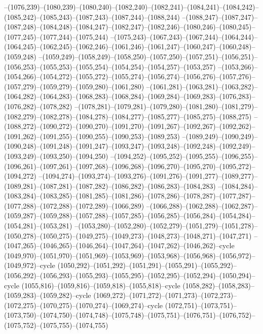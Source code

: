 --(1076,239)--(1080,239)--(1080,240)--(1082,240)--(1082,241)--(1084,241)--(1084,242)--(1085,242)--(1085,243)--(1087,243)--(1087,244)--(1088,244)
--(1088,247)--(1087,247)--(1087,248)--(1084,248)--(1084,247)--(1082,247)--(1082,246)--(1080,246)--(1080,245)--(1077,245)--(1077,244)--(1075,244)
--(1075,243)--(1067,243)--(1067,244)--(1064,244)--(1064,245)--(1062,245)--(1062,246)--(1061,246)--(1061,247)--(1060,247)--(1060,248)--(1059,248)
--(1059,249)--(1058,249)--(1058,250)--(1057,250)--(1057,251)--(1056,251)--(1056,253)--(1055,253)--(1055,254)--(1054,254)--(1054,257)--(1053,257)
--(1053,266)--(1054,266)--(1054,272)--(1055,272)--(1055,274)--(1056,274)--(1056,276)--(1057,276)--(1057,279)--(1059,279)--(1059,280)--(1061,280)
--(1061,281)--(1063,281)--(1063,282)--(1064,282)--(1064,283)--(1068,283)--(1068,284)--(1069,284)--(1069,283)--(1076,283)--(1076,282)--(1078,282)
--(1078,281)--(1079,281)--(1079,280)--(1081,280)--(1081,279)--(1082,279)--(1082,278)--(1084,278)--(1084,277)--(1085,277)--(1085,275)--(1088,275)
--(1088,272)--(1090,272)--(1090,270)--(1091,270)--(1091,267)--(1092,267)--(1092,262)--(1091,262)--(1091,255)--(1090,255)--(1090,253)--(1089,253)
--(1089,249)--(1090,249)--(1090,248)--(1091,248)--(1091,247)--(1093,247)--(1093,248)--(1092,248)--(1092,249)--(1093,249)--(1093,250)--(1094,250)
--(1094,252)--(1095,252)--(1095,255)--(1096,255)--(1096,261)--(1097,261)--(1097,268)--(1096,268)--(1096,270)--(1095,270)--(1095,272)--(1094,272)
--(1094,274)--(1093,274)--(1093,276)--(1091,276)--(1091,277)--(1089,277)--(1089,281)--(1087,281)--(1087,282)--(1086,282)--(1086,283)--(1084,283)
--(1084,284)--(1083,284)--(1083,285)--(1081,285)--(1081,286)--(1078,286)--(1078,287)--(1077,287)--(1077,288)--(1072,288)--(1072,289)--(1066,289)
--(1066,288)--(1062,288)--(1062,287)--(1059,287)--(1059,288)--(1057,288)--(1057,285)--(1056,285)--(1056,284)--(1054,284)--(1054,281)--(1053,281)
--(1053,280)--(1052,280)--(1052,279)--(1051,279)--(1051,278)--(1050,278)--(1050,275)--(1049,275)--(1049,273)--(1048,273)--(1048,271)--(1047,271)
--(1047,265)--(1046,265)--(1046,264)--(1047,264)--(1047,262)--(1046,262)--cycle
(1049,970)--(1051,970)--(1051,969)--(1053,969)--(1053,968)--(1056,968)--(1056,972)--(1049,972)--cycle
(1050,292)--(1051,292)--(1051,291)--(1055,291)--(1055,292)--(1056,292)--(1056,293)--(1055,293)--(1055,295)--(1052,295)--(1052,294)--(1050,294)--cycle
(1055,816)--(1059,816)--(1059,818)--(1055,818)--cycle
(1058,282)--(1058,283)--(1059,283)--(1059,282)--cycle
(1069,272)--(1071,272)--(1071,273)--(1072,273)--(1072,275)--(1070,275)--(1070,274)--(1069,274)--cycle
(1072,751)--(1073,751)--(1073,750)--(1074,750)--(1074,748)--(1075,748)--(1075,751)--(1076,751)--(1076,752)--(1075,752)--(1075,755)--(1074,755)
